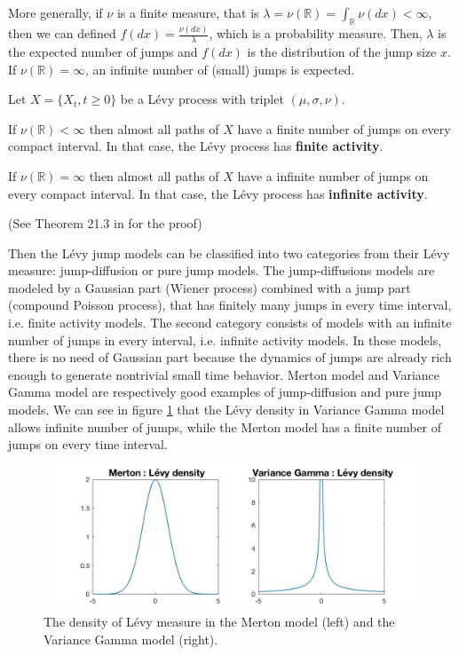 More generally, if $\nu$ is a finite measure, that is $\lambda = \nu(\mathbb{R}) =\int_\mathbb{R}\nu(dx) <\infty$, 
then we can defined $f(dx) = \frac{\nu(dx)}{\lambda}$, which is a probability measure. Then, $\lambda$ is the expected number of jumps and $f(dx)$ is the distribution of the jump size $x$. If $\nu(\mathbb{R}) = \infty$, an infinite number of (small) jumps is expected.

\begin{prop}
Let $X =\{X_t,t\geq 0\}$ be a L\'evy process with triplet $(\mu,\sigma,\nu)$.
\begin{my_list}
\item If $\nu(\mathbb{R})<\infty$ then almost all paths of $X$ have a finite number of jumps on every compact interval. In that case, the L\'evy process has \textbf{finite activity}.
\item If $\nu(\mathbb{R})=\infty$ then almost all paths of $X$ have a infinite number of jumps on every compact interval. In that case, the L\'evy process has \textbf{infinite activity}.
\end{my_list}
(See Theorem 21.3 in \citeauthor{Sat99} \citeyearpar{Sat99} for the proof)
\end{prop}

Then the L\'evy jump models can be classified into two categories from their L\'evy measure: jump-diffusion or pure jump models. The jump-diffusions models are modeled by a Gaussian part (Wiener process) combined with a jump part (compound Poisson process), that has finitely many jumps in every time interval, i.e. finite activity models. The second category consists of models with an infinite number of jumps in every interval, i.e. infinite activity models. In these models, there is no need of Gaussian part because the dynamics of jumps are already rich enough to generate nontrivial small time behavior. Merton model and Variance Gamma model are respectively good examples of jump-diffusion and pure jump models. We can see in figure \ref{fig:Levy:densities} that the L\'evy density in Variance Gamma model allows infinite number of jumps, while the Merton model has a finite number of jumps on every time interval.

\begin{figure}[!htb]
	\includegraphics[width=\textwidth]{gfx/Levy_densities}
	\caption{The density of L\'evy measure in the Merton model (left) and the Variance Gamma model (right).}
	\label{fig:Levy:densities}
\end{figure}

